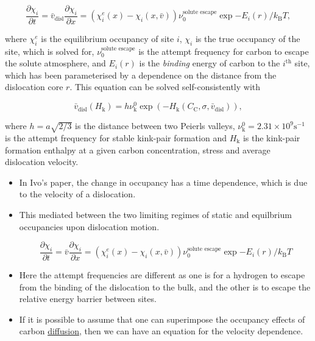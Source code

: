 \documentclass[a4paper,11pt]{article}
\numberwithin{equation}{chapter}
\numberwithin{listing}{chapter}
\begin{document}
\[ \frac{\partial \chi_i}{\partial t} = \bar{v}_{\text{disl} }\frac{\partial
    \chi_i}{\partial x} = \left( \chi_i^e(x) - \chi_i(x,\bar{v})
    \right) \nu_0^{\text{solute escape}} \exp{ - E_i(r) / k_{\text{B}} T}, \label{eq:ivo_diffusion_model} \]

where \(\chi^e_i\) is the equilibrium occupancy of site \(i\), \(\chi_i\) is the
true occupancy of the site, which is solved for, \(\nu_0^{\text{solute
    escape}}\) is the attempt frequency for carbon to escape the solute
atmosphere, and \(E_i(r)\) is the
\emph{binding} energy of carbon to the \(i^{\text{th}}\) site, which has been
parameterised by a dependence on the distance from the dislocation
core \(r\). This equation can be solved self-consistently with

\[ \bar{v}_{\text{disl}}(H_{\text{k}}) = h\nu^0_{\text{k} }
    \exp \left( -H_{\text{k}}(C_{\text{C}}, \sigma, \bar{v}_{\text{disl} }) \right), \]

where \(h = a\sqrt{2/3}\) is the distance between two Peierls valleys,
\(\nu^0_{\text{k} } = 2.31\times 10^{9} \text{s}^{-1}\) is the attempt
frequency for stable kink-pair formation and \(H_{\text{k} }\) is the
kink-pair formation enthalpy at a given carbon concentration, stress and
average dislocation velocity.


\begin{itemize}
\item In Ivo's paper, the change in occupancy has a time dependence,
which is due to the velocity of a dislocation.
\item This mediated between the two limiting regimes of static and
equilbrium occupancies upon dislocation motion.

\[ \frac{\partial \chi_i}{\partial t} = \bar{v}\frac{\partial
      \chi_i}{\partial x} = \left( \chi_i^e(x) - \chi_i(x,\bar{v})
      \right) \nu_0^{\text{solute escape}} \exp{ - E_i(r) / k_{\text{B}} T} \]

\item Here the attempt frequencies are different as one is for a
hydrogen to escape from the binding of the dislocation to the
bulk, and the other is to escape the relative energy barrier
between sites.

\item If it is possible to assume that one can superimpose the
occupancy effects of carbon \uline{diffusion}, then we can have an
equation for the velocity dependence.
\end{itemize}
\end{document}
